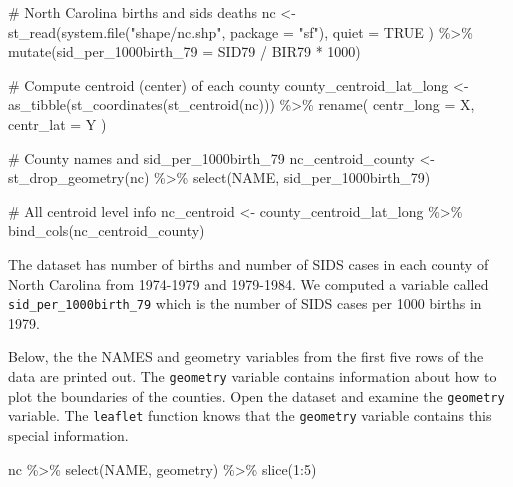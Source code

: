 \documentclass[
  letterpaper,
  DIV=11,
  numbers=noendperiod]{scrreprt}
\newenvironment{Shaded}{\begin{snugshade}}{\end{snugshade}}
\newcommand{\AttributeTok}[1]{\textcolor[rgb]{0.40,0.45,0.13}{#1}}
\newcommand{\CommentTok}[1]{\textcolor[rgb]{0.37,0.37,0.37}{#1}}
\newcommand{\ConstantTok}[1]{\textcolor[rgb]{0.56,0.35,0.01}{#1}}
\newcommand{\DecValTok}[1]{\textcolor[rgb]{0.68,0.00,0.00}{#1}}
\newcommand{\FunctionTok}[1]{\textcolor[rgb]{0.28,0.35,0.67}{#1}}
\newcommand{\NormalTok}[1]{\textcolor[rgb]{0.00,0.23,0.31}{#1}}
\newcommand{\OtherTok}[1]{\textcolor[rgb]{0.00,0.23,0.31}{#1}}
\newcommand{\SpecialCharTok}[1]{\textcolor[rgb]{0.37,0.37,0.37}{#1}}
\newcommand{\StringTok}[1]{\textcolor[rgb]{0.13,0.47,0.30}{#1}}
\begin{document}
\begin{Shaded}
\begin{Highlighting}[]
\CommentTok{\# North Carolina births and sids deaths}
\NormalTok{nc }\OtherTok{\textless{}{-}} \FunctionTok{st\_read}\NormalTok{(}\FunctionTok{system.file}\NormalTok{(}\StringTok{"shape/nc.shp"}\NormalTok{, }\AttributeTok{package =} \StringTok{"sf"}\NormalTok{),}
  \AttributeTok{quiet =} \ConstantTok{TRUE}
\NormalTok{) }\SpecialCharTok{\%\textgreater{}\%}
  \FunctionTok{mutate}\NormalTok{(}\AttributeTok{sid\_per\_1000birth\_79 =}\NormalTok{ SID79 }\SpecialCharTok{/}\NormalTok{ BIR79 }\SpecialCharTok{*} \DecValTok{1000}\NormalTok{)}

\CommentTok{\# Compute centroid (center) of each county}
\NormalTok{county\_centroid\_lat\_long }\OtherTok{\textless{}{-}} \FunctionTok{as\_tibble}\NormalTok{(}\FunctionTok{st\_coordinates}\NormalTok{(}\FunctionTok{st\_centroid}\NormalTok{(nc))) }\SpecialCharTok{\%\textgreater{}\%}
  \FunctionTok{rename}\NormalTok{(}
    \AttributeTok{centr\_long =}\NormalTok{ X,}
    \AttributeTok{centr\_lat =}\NormalTok{ Y}
\NormalTok{  )}

\CommentTok{\# County names and sid\_per\_1000birth\_79}
\NormalTok{nc\_centroid\_county }\OtherTok{\textless{}{-}} \FunctionTok{st\_drop\_geometry}\NormalTok{(nc) }\SpecialCharTok{\%\textgreater{}\%}
  \FunctionTok{select}\NormalTok{(NAME, sid\_per\_1000birth\_79)}

\CommentTok{\# All centroid level info}
\NormalTok{nc\_centroid }\OtherTok{\textless{}{-}}\NormalTok{ county\_centroid\_lat\_long }\SpecialCharTok{\%\textgreater{}\%}
  \FunctionTok{bind\_cols}\NormalTok{(nc\_centroid\_county)}
\end{Highlighting}
\end{Shaded}

The dataset has number of births and number of SIDS cases in each county
of North Carolina from 1974-1979 and 1979-1984. We computed a variable
called \texttt{sid\_per\_1000birth\_79} which is the number of SIDS
cases per 1000 births in 1979.

Below, the the NAMES and geometry variables from the first five rows of
the data are printed out. The \texttt{geometry} variable contains
information about how to plot the boundaries of the counties. Open the
dataset and examine the \texttt{geometry} variable. The \texttt{leaflet}
function knows that the \texttt{geometry} variable contains this special
information.

\begin{Shaded}
\begin{Highlighting}[]
\NormalTok{nc }\SpecialCharTok{\%\textgreater{}\%}
  \FunctionTok{select}\NormalTok{(NAME, geometry) }\SpecialCharTok{\%\textgreater{}\%}
  \FunctionTok{slice}\NormalTok{(}\DecValTok{1}\SpecialCharTok{:}\DecValTok{5}\NormalTok{)}
\end{Highlighting}
\end{Shaded}
\end{document}
